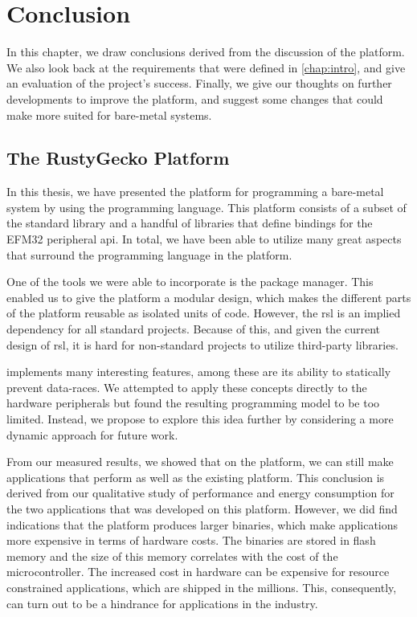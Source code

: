 
\chapter{Conclusion}
\label{chap:conclusion}

In this chapter, we draw conclusions derived from the discussion of the {\rg} platform.
We also look back at the requirements that were defined in \autoref{chap:intro}, and give an evaluation of the project's success.
Finally, we give our thoughts on further developments to improve the {\rg} platform, and suggest some changes that could make {\rust} more suited for bare-metal systems.

\section{The RustyGecko Platform}

In this thesis, we have presented the {\rg} platform for programming a bare-metal system by using the {\rust} programming language.
This platform consists of a subset of the {\rust} standard library and a handful of libraries that define bindings for the EFM32 peripheral \gls{api}.
In total, we have been able to utilize many great aspects that surround the {\rust} programming language in the {\rg} platform.

One of the tools we were able to incorporate is the {\cargo} package manager.
This enabled us to give the {\rg} platform a modular design, which makes the different parts of the platform reusable as isolated units of code.
However, the \gls{rsl} is an implied dependency for all standard {\rust} projects.
Because of this, and given the current design of \gls{rsl}, it is hard for non-standard projects to utilize third-party libraries.

{\rust} implements many interesting features, among these are its ability to statically prevent data-races.
We attempted to apply these concepts directly to the hardware peripherals but found the resulting programming model to be too limited.
Instead, we propose to explore this idea further by considering a more dynamic approach for future work.

From our measured results, we showed that on the {\rg} platform, we can still make applications that perform as well as the existing {\C} platform.
This conclusion is derived from our qualitative study of performance and energy consumption for the two applications that was developed on this platform.
However, we did find indications that the platform produces larger binaries, which make {\rust} applications more expensive in terms of hardware costs.
The binaries are stored in flash memory and the size of this memory correlates with the cost of the microcontroller.
The increased cost in hardware can be expensive for resource constrained applications, which are shipped in the millions.
This, consequently, can turn out to be a hindrance for applications in the industry.


